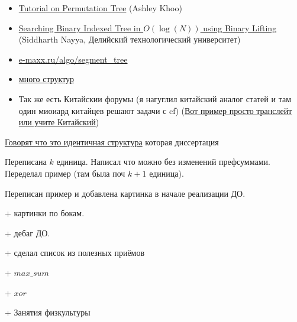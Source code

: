 \begin{itemize}
	\item \href{https://codeforces.com/blog/entry/78898}{Tutorial on Permutation Tree} (Ashley Khoo)
	
	\item \href{https://codeforces.com/blog/entry/61364}{Searching Binary Indexed Tree in $O( \log(N))$ using Binary Lifting} (Siddharth Nayya, Делийский технологический университет)
	
	\item \href{https://e-maxx.ru/algo/segment_tree}{e-maxx.ru/algo/segment\_tree}
	
	\item \href{https://codeforces.com/blog/entry/15729}{много структур}
	
	\item Так же есть Китайскии форумы (я нагуглил китайский аналог статей и там один миоиард китайцев решают задачи с cf) (\href{https://blog.csdn.net/weixin_43826249/article/details/102600666}{Вот пример просто транслейт или учите Китайский})
	
\end{itemize}


\href{https://codeforces.com/blog/entry/49446}{Говорят что это идентичная структура} которая диссертация 


Переписана $k$ единица. Написал что можно без изменений префсуммами. Переделал пример (там была поч $k + 1$ единица).

Переписан пример и добавлена картинка в начале реализации ДО.

+ картинки по бокам.

+ дебаг ДО.

+ сделал список из полезных приёмов

+ $max\_sum$

+ $xor$

+ Занятия физкультуры